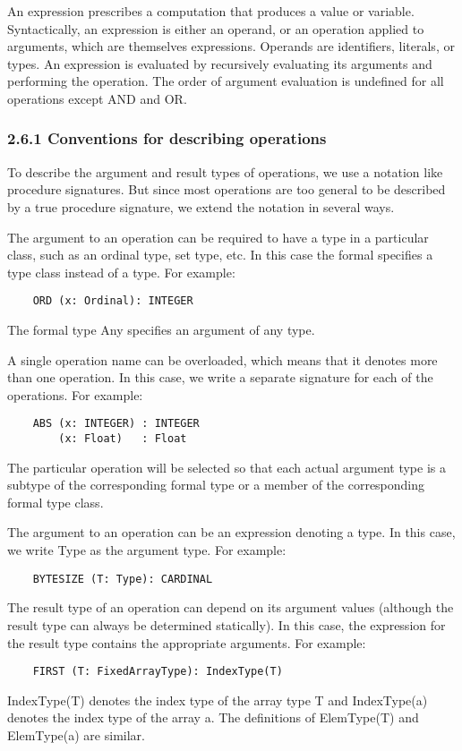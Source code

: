 \documentclass[10pt]{article}
\begin{document}
An expression prescribes a computation that produces a value or variable. Syntactically, an expression is either an operand, or an operation applied to arguments, which are themselves expressions. Operands are identifiers, literals, or types. An expression is evaluated by recursively evaluating its arguments and performing the operation. The order of argument evaluation is undefined for all operations except AND and OR.

\subsubsection*{2.6.1 Conventions for describing operations}

To describe the argument and result types of operations, we use a notation
like procedure signatures. But since most operations are too general to be
described by a true procedure signature, we extend the notation in several
ways.

The argument to an operation can be required to have a type in a particular
class, such as an ordinal type, set type, etc. In this case the formal
specifies a type class instead of a type. For example:
\begin{verbatim}
    ORD (x: Ordinal): INTEGER
\end{verbatim}
The formal type Any specifies an argument of any type.

A single operation name can be overloaded, which means that it denotes more
than one operation. In this case, we write a separate signature for each of
the operations. For example:
\begin{verbatim}
    ABS (x: INTEGER) : INTEGER
        (x: Float)   : Float
\end{verbatim}
The particular operation will be selected so that each actual argument type is
a subtype of the corresponding formal type or a member of the corresponding
formal type class.

The argument to an operation can be an expression denoting a type. In this
case, we write Type as the argument type. For example:
\begin{verbatim}
    BYTESIZE (T: Type): CARDINAL
\end{verbatim}
The result type of an operation can depend on its argument values (although
the result type can always be determined statically). In this case, the
expression for the result type contains the appropriate arguments. For
example:
\begin{verbatim}
    FIRST (T: FixedArrayType): IndexType(T)
\end{verbatim}
IndexType(T) denotes the index type of the array type T and IndexType(a)
denotes the index type of the array a. The definitions of ElemType(T) and
ElemType(a) are similar.
\end{document}
